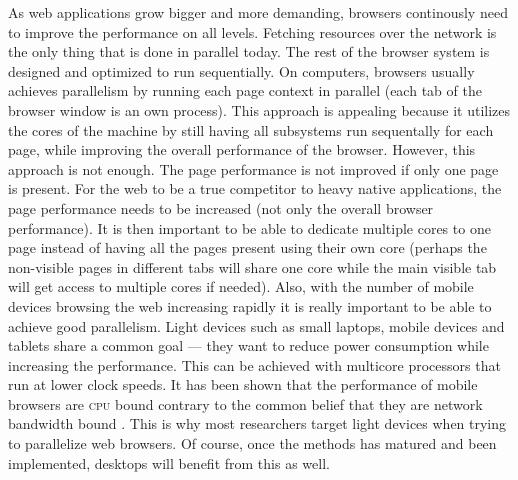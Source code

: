 \documentclass[a4paper,11pt]{kth-mag}
\begin{document}
        As web applications grow bigger and more demanding, browsers continously need to improve the performance on all levels.
        Fetching resources over the network is the only thing that is done in parallel today.
        The rest of the browser system is designed and optimized to run sequentially.
        On computers, browsers usually achieves parallelism by running each page context in parallel (each tab of the browser window is an own process).
        This approach is appealing because it utilizes the cores of the machine by still having all subsystems run sequentally for each page, while improving the overall performance of the browser.
        However, this approach is not enough.
        The page performance is not improved if only one page is present.
        For the web to be a true competitor to heavy native applications, the page performance needs to be increased (not only the overall browser performance).
        It is then important to be able to dedicate multiple cores to one page instead of having all the pages present using their own core (perhaps the non-visible pages in different tabs will share one core while the main visible tab will get access to multiple cores if needed).
        Also, with the number of mobile devices browsing the web increasing rapidly it is really important to be able to achieve good parallelism.
        Light devices such as small laptops, mobile devices and tablets share a common goal --- they want to reduce power consumption while increasing the performance.
        This can be achieved with multicore processors that run at lower clock speeds.
        It has been shown that the performance of mobile browsers are \textsc{cpu} bound contrary to the common belief that they are network bandwidth bound \cite{parallelizing_the_web_browser}.
        This is why most researchers target light devices when trying to parallelize web browsers.
        Of course, once the methods has matured and been implemented, desktops will benefit from this as well.
\end{document}
